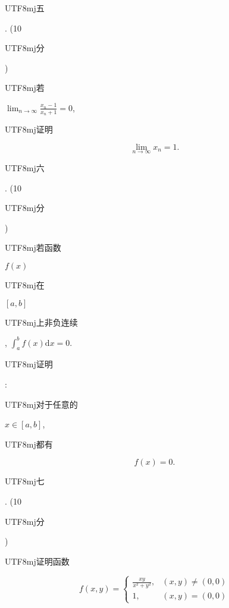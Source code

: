 \documentclass[10pt]{article}
\begin{document}
\begin{CJK}{UTF8}{mj}五\end{CJK}. (10 \begin{CJK}{UTF8}{mj}分\end{CJK}) \begin{CJK}{UTF8}{mj}若\end{CJK} $\lim _{n \rightarrow \infty} \frac{x_{n}-1}{x_{n}+1}=0$, \begin{CJK}{UTF8}{mj}证明\end{CJK}
$$
\lim _{n \rightarrow \infty} x_{n}=1 .
$$
\begin{CJK}{UTF8}{mj}六\end{CJK}. (10 \begin{CJK}{UTF8}{mj}分\end{CJK}) \begin{CJK}{UTF8}{mj}若函数\end{CJK} $f(x)$ \begin{CJK}{UTF8}{mj}在\end{CJK} $[a, b]$ \begin{CJK}{UTF8}{mj}上非负连续\end{CJK}, $\int_{a}^{b} f(x) \mathrm{d} x=0$. \begin{CJK}{UTF8}{mj}证明\end{CJK}: \begin{CJK}{UTF8}{mj}对于任意的\end{CJK} $x \in[a, b]$, \begin{CJK}{UTF8}{mj}都有\end{CJK}
$$
f(x)=0 .
$$
\begin{CJK}{UTF8}{mj}七\end{CJK}. (10 \begin{CJK}{UTF8}{mj}分\end{CJK}) \begin{CJK}{UTF8}{mj}证明函数\end{CJK}
$$
f(x, y)= \begin{cases}\frac{x y}{x^{2}+y^{2}}, & (x, y) \neq(0,0) \\ 1, & (x, y)=(0,0)\end{cases}
$$
\end{document}
